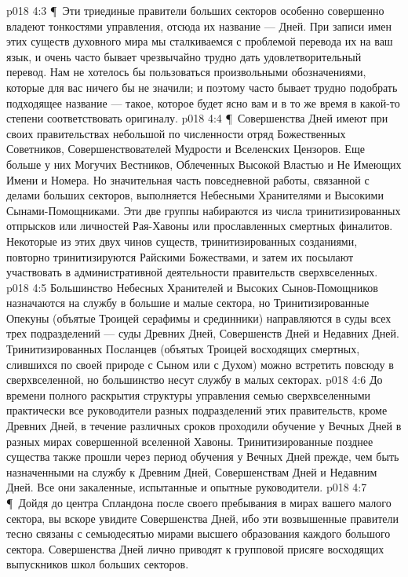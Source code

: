 \vs p018 4:3 \P\ Эти триединые правители больших секторов особенно совершенно владеют тонкостями управления, отсюда их название ---  Дней. При записи имен этих существ духовного мира мы сталкиваемся с проблемой перевода их на ваш язык, и очень часто бывает чрезвычайно трудно дать удовлетворительный перевод. Нам не хотелось бы пользоваться произвольными обозначениями, которые для вас ничего бы не значили; и поэтому часто бывает трудно подобрать подходящее название --- такое, которое будет ясно вам и в то же время в какой\hyp{}то степени соответствовать оригиналу.
\vs p018 4:4 \P\ Совершенства Дней имеют при своих правительствах небольшой по численности отряд Божественных Советников, Совершенствователей Мудрости и Вселенских Цензоров. Еще больше у них Могучих Вестников, Облеченных Высокой Властью и Не Имеющих Имени и Номера. Но значительная часть повседневной работы, связанной с делами больших секторов, выполняется Небесными Хранителями и Высокими Сынами\hyp{}Помощниками. Эти две группы набираются из числа тринитизированных отпрысков или личностей Рая\hyp{}Хавоны или прославленных смертных финалитов. Некоторые из этих двух чинов существ, тринитизированных созданиями, повторно тринитизируются Райскими Божествами, и затем их посылают участвовать в административной деятельности правительств сверхвселенных.
\vs p018 4:5 Большинство Небесных Хранителей и Высоких Сынов\hyp{}Помощников назначаются на службу в большие и малые сектора, но Тринитизированные Опекуны (объятые Троицей серафимы и срединники) направляются в суды всех трех подразделений --- суды Древних Дней, Совершенств Дней и Недавних Дней. Тринитизированных Посланцев (объятых Троицей восходящих смертных, слившихся по своей природе с Сыном или с Духом) можно встретить повсюду в сверхвселенной, но большинство несут службу в малых секторах.
\vs p018 4:6 До времени полного раскрытия структуры управления семью сверхвселенными практически все руководители разных подразделений этих правительств, кроме Древних Дней, в течение различных сроков проходили обучение у Вечных Дней в разных мирах совершенной вселенной Хавоны. Тринитизированные позднее существа также прошли через период обучения у Вечных Дней прежде, чем быть назначенными на службу к Древним Дней, Совершенствам Дней и Недавним Дней. Все они закаленные, испытанные и опытные руководители.
\vs p018 4:7 \P\ Дойдя до центра Спландона после своего пребывания в мирах вашего малого сектора, вы вскоре увидите Совершенства Дней, ибо эти возвышенные правители тесно связаны с семьюдесятью мирами высшего образования каждого большого сектора. Совершенства Дней лично приводят к групповой присяге восходящих выпускников школ больших секторов.
